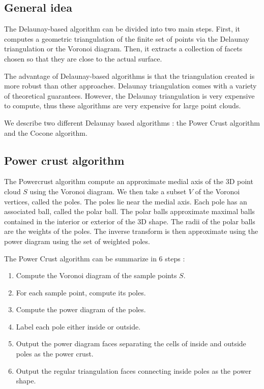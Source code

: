 \documentclass[a4paper]{article}
\begin{document}
\subsection{General idea}
The Delaunay-based algorithm can be divided into two main steps. First, it computes a geometric triangulation of the finite set of points via the Delaunay triangulation or the Voronoi diagram. Then, it extracts a collection of facets chosen so that they are close to the actual surface.

The advantage of Delaunay-based algorithms is that the triangulation created is more robust than other approaches. Delaunay triangulation comes with a variety of theoretical guarantees. However, the Delaunay triangulation is very expensive to compute, thus these algorithms are very expensive for large point clouds.

We describe two different Delaunay based algorithms : the Power Crust algorithm and the Cocone algorithm.

\subsection{Power crust algorithm}
The Powercrust algorithm compute an approximate medial axis of the 3D point cloud $S$ using the Voronoi diagram. We then take a subset $V$ of the Voronoi vertices, called the poles. The poles lie near the medial axis. Each pole has an associated ball, called the polar ball. The polar balls approximate maximal balls contained in the interior or exterior of the 3D shape. The radii of the polar balls are the weights of the poles. The inverse transform is then approximate using the power diagram using the set of weighted poles.

The Power Crust algorithm can be summarize in 6 steps :
\begin{enumerate}
\item Compute the Voronoi diagram of the sample points $S$.
\item For each sample point, compute its poles.
\item Compute the power diagram of the poles.
\item Label each pole either inside or outside.
\item Output the power diagram faces separating the cells of inside and outside poles as the power crust.
\item Output the regular triangulation faces connecting inside poles as the power shape.
\end{enumerate}
\end{document}
